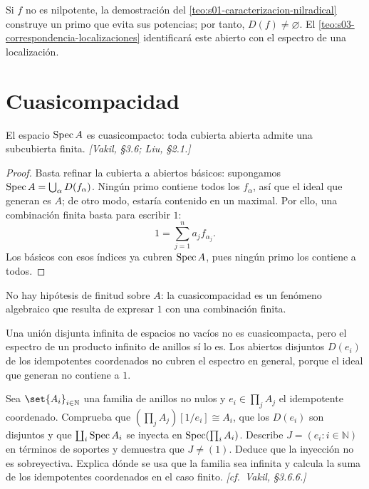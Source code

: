 \begin{obs}
\label{obs:s02-promesa-cumplida-otra-sembrada}
Si $f$ no es nilpotente, la demostración del \cref{teo:s01-caracterizacion-nilradical} construye un primo que evita sus potencias; por tanto, $D(f)\ne\varnothing$. El \cref{teo:s03-correspondencia-localizaciones} identificará este abierto con el espectro de una localización.
\end{obs}

\section{Cuasicompacidad}

\begin{prop}
\label{prop:s02-espacio-cuasicompacto-toda-cubierta-abierta}
El espacio $\operatorname{Spec} A$ es cuasicompacto: toda cubierta abierta admite una subcubierta finita. \emph{[Vakil, \S3.6; Liu, \S2.1.]}
\end{prop}
\begin{proof}
Basta refinar la cubierta a abiertos básicos: supongamos $\operatorname{Spec} A=\bigcup_\alpha D(f_\alpha)$. Ningún primo contiene todos los $f_\alpha$, así que el ideal que generan es $A$; de otro modo, estaría contenido en un maximal. Por ello, una combinación finita basta para escribir $1$:
\[
1=\sum_{j=1}^n a_jf_{\alpha_j}.
\]
Los básicos con esos índices ya cubren $\operatorname{Spec} A$, pues ningún primo los contiene a todos.
\end{proof}

\begin{obs}
\label{obs:s02-no-hipotesis-finitud-sobre-cuasicompacidad}
No hay hipótesis de finitud sobre $A$: la cuasicompacidad es un fenómeno algebraico que resulta de expresar $1$ con una combinación finita.
\end{obs}

\begin{obs}
\label{obs:s02-tension-vale-pena-notar}
Una unión disjunta infinita de espacios no vacíos no es cuasicompacta, pero el espectro de un producto infinito de anillos sí lo es. Los abiertos disjuntos $D(e_i)$ de los idempotentes coordenados no cubren el espectro en general, porque el ideal que generan no contiene a $1$.
\end{obs}

\begin{ejer}
\label{ejer:s02-sembrador-cosecha-sesion-6}
Sea $\set{A_i}_{i\in\mathbb N}$ una familia de anillos no nulos y $e_i\in\prod_jA_j$ el idempotente coordenado. Comprueba que $(\prod_jA_j)[1/e_i]\cong A_i$, que los $D(e_i)$ son disjuntos y que $\coprod_i\operatorname{Spec} A_i$ se inyecta en $\operatorname{Spec}(\prod_iA_i)$. Describe $J=(e_i:i\in\mathbb N)$ en términos de soportes y demuestra que $J\ne(1)$. Deduce que la inyección no es sobreyectiva. Explica dónde se usa que la familia sea infinita y calcula la suma de los idempotentes coordenados en el caso finito. \emph{[cf.~Vakil, \S3.6.6.]}
\end{ejer}

